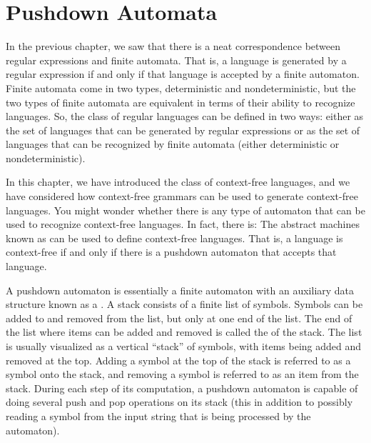 \section{Pushdown Automata}\label{S-grammars-3b}

In the previous chapter, we saw that there is a neat correspondence
between regular expressions and finite automata.  That is, a language
is generated by a regular expression if and only if that language is
accepted by a finite automaton.  Finite automata come in two types,
deterministic and nondeterministic, but the two types of finite
automata are equivalent in terms of their ability to recognize
languages.  So, the class of regular languages can be defined in
two ways: either as the set of languages that can be generated by
regular expressions or as the set of languages that can be recognized
by finite automata (either deterministic or nondeterministic).

In this chapter, we have introduced the class of context-free languages,
and we have considered how context-free grammars can be used to
generate context-free languages.  You might wonder whether there is any
type of automaton that can be used to recognize context-free languages.
In fact, there is:  The abstract machines known as 
 can be used to define
context-free languages.  That is, a language is context-free if and only
if there is a pushdown automaton that accepts that language.

\medbreak

A pushdown automaton is essentially a finite automaton with an auxiliary 
data structure known as a .  A stack consists of
a finite list of symbols.  Symbols can be added to and removed from the
list, but only at one end of the list.  The end of the list where items
can be added and removed is called the  of the stack.
The list is usually visualized as a vertical ``stack'' of symbols,
with items being added and removed at the top.  Adding a symbol at
the top of the stack is referred to as  a symbol onto 
the stack, and removing a symbol is referred to as 
an item from the stack.  During each step of its computation, 
a pushdown automaton is capable of doing several
push and pop operations on its stack (this in addition to possibly reading
a symbol from the input string that is being processed by the automaton).

